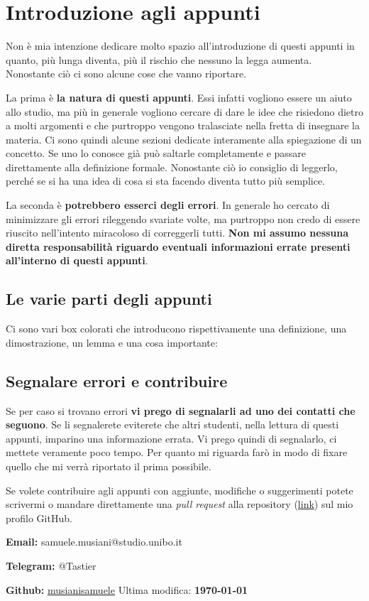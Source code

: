 \section{Introduzione agli appunti}

Non è mia intenzione dedicare molto spazio all'introduzione di questi appunti 
in quanto, più lunga diventa, più il rischio che nessuno la legga aumenta. 
Nonostante ciò ci sono alcune cose che vanno riportare. 

La prima è \textbf{la natura di questi appunti}. Essi infatti vogliono essere 
un aiuto allo studio, ma più in generale vogliono cercare di dare le idee che 
risiedono dietro a molti argomenti e che purtroppo vengono tralasciate nella 
fretta di insegnare la materia. Ci sono quindi alcune sezioni dedicate 
interamente alla spiegazione di un concetto. Se uno lo conosce già può saltarle 
completamente e passare direttamente alla definizione formale. Nonostante ciò 
io consiglio di leggerlo, perché se si ha una idea di cosa si sta facendo 
diventa tutto più semplice.\bigbreak

La seconda è \textbf{potrebbero esserci degli errori}. In generale ho cercato 
di minimizzare gli errori rileggendo svariate volte, ma purtroppo non credo di 
essere riuscito nell'intento miracoloso di correggerli tutti. \textbf{Non mi 
assumo nessuna diretta responsabilità riguardo eventuali informazioni errate 
presenti all'interno di questi appunti}.

\subsection{Le varie parti degli appunti}
Ci sono vari box colorati che introducono rispettivamente una definizione, una 
dimostrazione, un lemma e una cosa importante:






\subsection{Segnalare errori e contribuire}
Se per caso si trovano errori \textbf{vi prego di segnalarli ad uno dei 
contatti che seguono}. Se li segnalerete eviterete che altri studenti, nella 
lettura di questi appunti, imparino una informazione errata. Vi prego quindi di 
segnalarlo, ci mettete veramente poco tempo. Per quanto mi riguarda farò in 
modo di fixare quello che mi verrà riportato il prima possibile.\bigbreak

Se volete contribuire agli appunti con aggiunte, modifiche o suggerimenti 
potete scrivermi o mandare direttamente una \textit{pull request} alla 
repository (\href{https://github.com/musianisamuele/Analisi}{link}) sul mio 
profilo GitHub.\bigbreak


\textbf{Email:} samuele.musiani@studio.unibo.it\bigbreak

\textbf{Telegram:} @Tastier\bigbreak

\textbf{Github:} \href{https://github.com/musianisamuele}{musianisamuele}
\hfill Ultima modifica: \textbf{\today}
